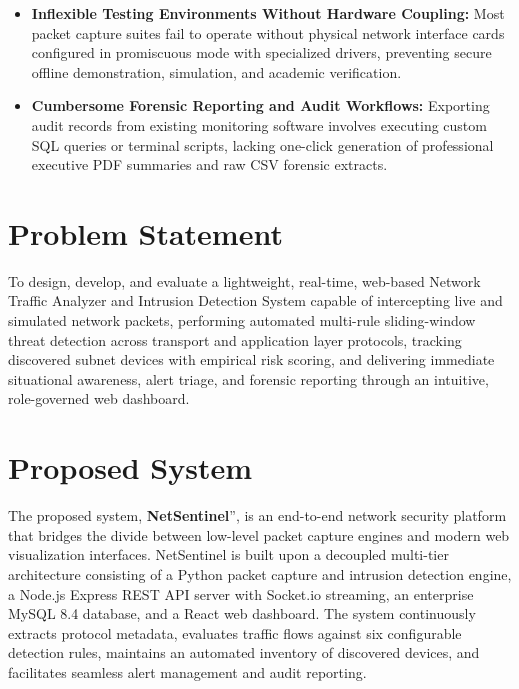 \documentclass[a4paper,12pt]{report}
\begin{document}
\begin{itemize}
		\item \textbf{Inflexible Testing Environments Without Hardware Coupling:}
		Most packet capture suites fail to operate without physical network interface cards configured in promiscuous mode with specialized drivers, preventing secure offline demonstration, simulation, and academic verification.
		
		\item \textbf{Cumbersome Forensic Reporting and Audit Workflows:}
		Exporting audit records from existing monitoring software involves executing custom SQL queries or terminal scripts, lacking one-click generation of professional executive PDF summaries and raw CSV forensic extracts.
	\end{itemize}
	
	\section{Problem Statement}
	\par
	To design, develop, and evaluate a lightweight, real-time, web-based Network Traffic Analyzer and Intrusion Detection System capable of intercepting live and simulated network packets, performing automated multi-rule sliding-window threat detection across transport and application layer protocols, tracking discovered subnet devices with empirical risk scoring, and delivering immediate situational awareness, alert triage, and forensic reporting through an intuitive, role-governed web dashboard.
	
	\section{Proposed System}
	\par
	The proposed system, \textbf{NetSentinel}'', is an end-to-end network security platform that bridges the divide between low-level packet capture engines and modern web visualization interfaces. NetSentinel is built upon a decoupled multi-tier architecture consisting of a Python packet capture and intrusion detection engine, a Node.js Express REST API server with Socket.io streaming, an enterprise MySQL 8.4 database, and a React web dashboard. The system continuously extracts protocol metadata, evaluates traffic flows against six configurable detection rules, maintains an automated inventory of discovered devices, and facilitates seamless alert management and audit reporting.
	
\end{document}
